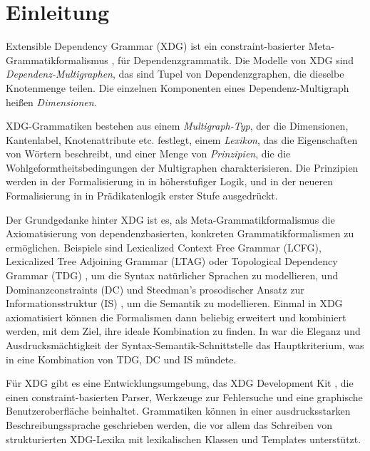 \chapter{Einleitung}

Extensible Dependency Grammar (XDG) ist ein constraint-basierter
Meta-Gram\-matikfor\-malismus \cite{DebusmannEtal04SS},
\cite{Debusmann06} f{\"u}r Dependenzgrammatik.  Die Modelle von XDG
sind \emph{Dependenz-Multigraphen}, das sind Tupel von
Dependenzgraphen, die dieselbe Knotenmenge teilen. Die einzelnen
Komponenten eines Dependenz-Multigraph hei{\ss}en \emph{Dimensionen}.

XDG-Grammatiken bestehen aus einem \emph{Multigraph-Typ}, der die
Dimensionen, Kantenlabel, Knotenattribute etc. festlegt, einem
\emph{Lexikon}, das die Eigenschaften von W{\"o}rtern beschreibt, und
einer Menge von \emph{Prinzipien}, die die Wohlgeformtheitsbedingungen
der Multigraphen charakterisieren. Die Prinzipien werden in der
Formalisierung in \cite{Debusmann06} in h{\"o}herstufiger Logik, und
in der neueren Formalisierung in \cite{Debusmann07MTS} in
Pr{\"a}dikatenlogik erster Stufe ausgedr{\"u}ckt.

Der Grundgedanke hinter XDG ist es, als Meta-Grammatikformalismus die
Axiomatisierung von dependenzbasierten, konkreten Grammatikformalismen
zu erm{\"o}glichen. Beispiele sind Lexicalized Context Free Grammar
(LCFG), Lexicalized Tree Adjoining Grammar (LTAG) \cite{Joshi87} oder
Topological Dependency Grammar (TDG) \cite{DuchierDebusmann01}, um die
Syntax nat{\"u}rlicher Sprachen zu modellieren, und
Dominanzconstraints (DC) \cite{EggEtal01} und Steedman's prosodischer
Ansatz zur Informationsstruktur (IS) \cite{Steedman00}, um die
Semantik zu modellieren. Einmal in XDG axiomatisiert k{\"o}nnen die
Formalismen dann beliebig erweitert und kombiniert werden, mit dem
Ziel, ihre ideale Kombination zu finden.  In \cite{Debusmann06} war
die Eleganz und Ausdrucksm{\"a}chtigkeit der
Syntax-Semantik-Schnittstelle das Hauptkriterium, was in eine
Kombination von TDG, DC und IS m{\"u}ndete.

F{\"u}r XDG gibt es eine Entwicklungsumgebung, das XDG Development Kit
\cite{DebusmannEtal04MOZ}, die einen constraint-basierten Parser,
Werkzeuge zur Fehlersuche und eine graphische Benutzeroberfl{\"a}che
beinhaltet. Grammatiken k{\"o}nnen in einer ausdrucksstarken
Beschreibungssprache geschrieben werden, die vor allem das Schreiben
von strukturierten XDG-Lexika mit lexikalischen Klassen und Templates
unterst{\"u}tzt.

